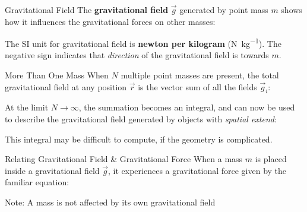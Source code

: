 \documentclass[12pt,aspectratio=169]{beamer}
\begin{document}
\begin{frame}{Gravitational Field}
  The \textbf{gravitational field} $\vec g$ generated by point mass $m$
  shows how it influences the gravitational forces on other masses:


  The SI unit for gravitational field is
  \textbf{newton per kilogram} (\si{\newton\per\kilo\gram}).
  The negative sign indicates that \emph{direction} of the gravitational field
  is towards $m$.
\end{frame}



\begin{frame}{More Than One Mass}
  When $N$ multiple point masses are present, the total gravitational field at
  any position $\vec r$ is the vector sum of all the fields $\vec g_i$:
    

  At the limit $N\rightarrow\infty$, the summation becomes an integral, and can
  now be used to describe the gravitational field generated by objects with
  \emph{spatial extend}:

  
  This integral may be difficult to compute, if the geometry is complicated.
\end{frame}



\begin{frame}{Relating Gravitational Field \& Gravitational Force}
  When a mass $m$ is placed inside a gravitational field $\vec g$, it
  experiences a gravitational force given by the familiar equation:


  Note: A mass is not affected by its own gravitational field
\end{frame}
\end{document}
